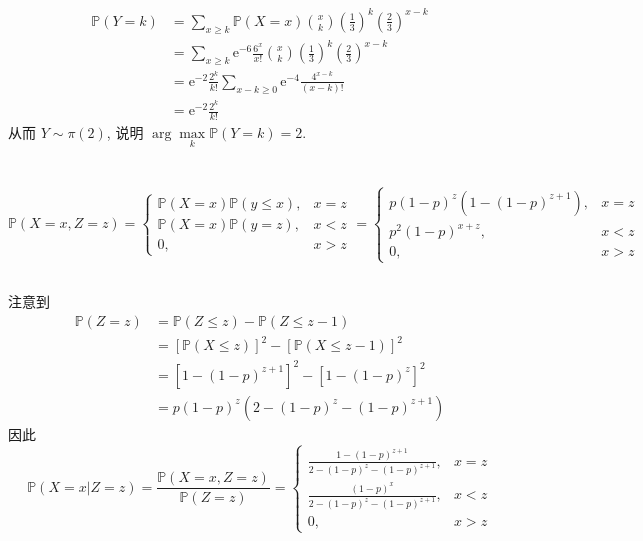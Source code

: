 \documentclass[8pt]{article}
\theoremstyle{compact}
\def\le{\leqslant}
\def\ge{\geqslant}
\def\P#1{\mathbb{P}\left({#1}\right)}
\def\e{\mathrm{e}}
\begin{document}
\section{}
\begin{equation}
	\begin{split}
		\P{Y = k} &= \sum_{x \ge k} \P{X = x} \binom{x}{k}\left(\frac13\right)^k\left(\frac23\right)^{x-k}\\
		&= \sum_{x \ge k} \e^{-6}\frac{6^x}{x!} \binom{x}{k}\left(\frac13\right)^k\left(\frac23\right)^{x-k}\\
		&= \e^{-2}\frac{2^k}{k!}\sum_{x - k \ge 0} \e^{-4}\frac{4^{x-k}}{(x-k)!}\\
		&= \e^{-2}\frac{2^k}{k!}
	\end{split}
\end{equation}
从而 $Y \sim \pi(2)$, 说明 $\arg\max\limits_k \P{Y = k} = 2$.

\section{}
\subsection{}
\begin{equation}
	\P{X = x, Z = z} = \begin{cases}
		\P{X = x}\P{y \le x}, & x = z\\
		\P{X = x}\P{y = z}, & x < z\\
		0, & x > z
	\end{cases}
	= \begin{cases}
		p(1-p)^{z}(1 - (1-p)^{z+1}), & x = z\\
		p^2(1-p)^{x + z}, & x < z\\
		0, & x > z
	\end{cases}
\end{equation}
\subsection{}
注意到
\begin{equation}
	\begin{split}
		\P{Z = z} &= \P{Z \le z} - \P{Z \le z - 1} \\
		&= \left[\P{X \le z}\right]^2 - \left[\P{X \le z - 1}\right]^2 \\
		&= [1 - (1-p)^{z+1}]^2 - [1 - (1-p)^{z}]^2\\
		&= p(1-p)^z(2 - (1-p)^z - (1-p)^{z+1})
	\end{split}
\end{equation}
因此
\begin{equation}
	\P{X = x | Z = z} = \frac{\P{X = x, Z = z}}{\P{Z = z}} = \begin{cases}
		\frac{1 - (1-p)^{z+1}}{2 - (1-p)^z - (1-p)^{z+1}}, & x = z\\
		\frac{(1-p)^x}{2 - (1-p)^z - (1-p)^{z+1}}, & x < z \\
		0, & x > z
	\end{cases}
\end{equation}
\end{document}
